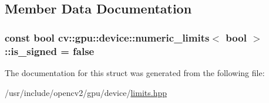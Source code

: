 \subsection{Member Data Documentation}
\hypertarget{structcv_1_1gpu_1_1device_1_1numeric__limits_3_01bool_01_4_a1645e11e2d0b314f3d929c2c2536cd19}{
\subsubsection[{is\-\_\-signed}]{\setlength{\rightskip}{0pt plus 5cm}const bool {\bf cv\-::gpu\-::device\-::numeric\-\_\-limits}$<$ bool $>$\-::is\-\_\-signed = {\bf false}\hspace{0.3cm}{\ttfamily [static]}}}\label{structcv_1_1gpu_1_1device_1_1numeric__limits_3_01bool_01_4_a1645e11e2d0b314f3d929c2c2536cd19}


The documentation for this struct was generated from the following file\-:\begin{DoxyCompactItemize}
\item 
/usr/include/opencv2/gpu/device/\hyperlink{limits_8hpp}{limits.\-hpp}\end{DoxyCompactItemize}

